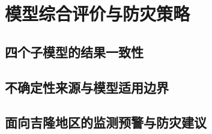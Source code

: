 \section{模型综合评价与防灾策略}\label{sec:evaluation}

\subsection{四个子模型的结果一致性}\label{sec:model-consistency}
\writingplaceholder

\subsection{不确定性来源与模型适用边界}\label{sec:uncertainty}
\writingplaceholder

\subsection{面向吉隆地区的监测预警与防灾建议}\label{sec:recommendations}
\writingplaceholder
